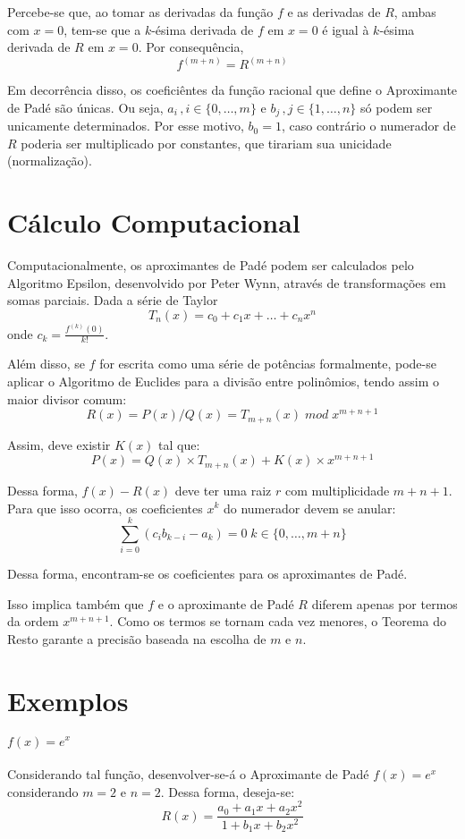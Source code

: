 	Percebe-se que, ao tomar as derivadas da função $f$ e as derivadas de $R$, ambas com $x=0$, tem-se que a $k$-ésima derivada
	de $f$ em $x=0$ é igual à $k$-ésima derivada de $R$ em $x=0$. Por consequência,
	$$f^{(m+n)} = R^{(m+n)}$$

	Em decorrência disso, os coeficiêntes da função racional que define o Aproximante de Padé são únicas. Ou seja,
	$a_i\,,i\in\{0,\dots,m\}$ e $b_j\,,j\in\{1,\dots,n\}$ só podem ser unicamente determinados. Por esse motivo, $b_0 = 1$,
	caso contrário o numerador de $R$ poderia ser multiplicado por constantes, que tirariam sua unicidade (normalização).

	\section{Cálculo Computacional}
	\label{sec:dev}
	Computacionalmente, os aproximantes de Padé podem ser calculados pelo Algoritmo Epsilon, desenvolvido por Peter Wynn,
	através de transformações em somas parciais. Dada a série de Taylor
	$$T_n(x) = c_0 + c_1x + \dots + c_nx^n$$
	onde $c_k = \frac{f^{(k)}(0)}{k!}$.

	Além disso, se $f$ for escrita como uma série de potências formalmente, pode-se aplicar o Algoritmo de Euclides para a divisão
	entre polinômios, tendo assim o maior divisor comum:
	$$R(x) = P(x)/Q(x) = T_{m+n}(x)\;mod\;x^{m+n+1}$$

	Assim, deve existir $K(x)$ tal que:
	$$P(x) = Q(x)\times T_{m+n}(x) + K(x)\times x^{m+n+1}$$

	Dessa forma, $f(x) - R(x)$ deve ter uma raiz $r$ com multiplicidade $m+n+1$. Para que isso ocorra, os coeficientes $x^k$ do numerador
	devem se anular:
	\begin{equation}\label{eq:max}
	\sum_{i=0}^{k}{(c_ib_{k-i} - a_k)} = 0\;k \in \{0, \dots, m+n\}
	\end{equation}

	Dessa forma, encontram-se os coeficientes para os aproximantes de Padé.

	Isso implica também que $f$ e o aproximante de Padé $R$ diferem apenas por termos da ordem $x^{m+n+1}$. Como
	os termos se tornam cada vez menores, o Teorema do Resto garante a precisão baseada na escolha de $m$ e $n$.

	\section{Exemplos}
	\paragraph{$f(x) = e^x$}
	Considerando tal função, desenvolver-se-á o Aproximante de Padé $f(x) = e^x$ considerando $m = 2$ e $n = 2$.
	Dessa forma, deseja-se:
	$$R(x) = \frac{a_0 + a_1x + a_2x^2}{1 + b_1x + b_2x^2}$$

